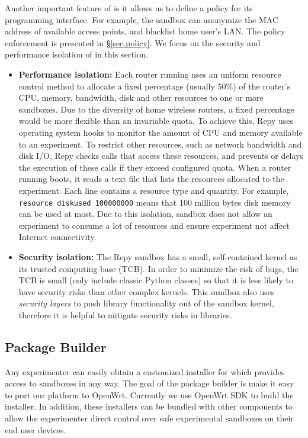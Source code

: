 Another important feature of \sandboxname is it allows us to define a policy for its programming interface. For example, the sandbox can anonymize the MAC address of available access points, and blacklist home user's LAN. The policy enforcement is presented in \S{\ref{sec.policy}}. We focus on the security and performance isolation of \sandboxname in this section.
\begin{itemize}
\item \textbf{Performance isolation: }Each router running \sysname uses an uniform resource control method to allocate a fixed percentage (usually 50\%) of the router's CPU, memory, bandwidth, disk and other resources to one or more sandboxes. Due to the diversity of home wireless routers, a fixed percentage would be more flexible than an invariable quota. To achieve this, Repy uses operating system hooks to monitor the amount of CPU and memory available to an experiment. To restrict other resources, such as network bandwidth and disk I/O, Repy checks calls that access these resources, and prevents or delays the execution of these calls if they exceed configured quota. When a router running \sysname boots, it reads a text file that lists the resources allocated to the experiment. Each line contains a resource type and quantity. For example, \texttt{resource diskused 100000000} means that 100 million bytes disk memory can be used at most. Due to this isolation, sandbox does not allow an experiment to consume a lot of resources and ensure experiment not affect Internet connectivity.

\item \textbf{Security isolation: }The Repy sandbox has a small, self-contained kernel as its trusted computing base (TCB). In order to minimize the risk of bugs, the TCB is small (only include classic Python classes) so that it is less likely to have security risks than other complex kernels. This sandbox also uses \textit{security layers} to push library functionality out of the sandbox kernel, therefore it is helpful to mitigate security risks in libraries. 

\end{itemize}
\subsection{Package Builder}
\label{sec.packagebuilder}
Any experimenter can easily obtain a customized installer for \sysname which provides access to sandboxes in any way. The goal of the package builder is make it easy to port our platform to OpenWrt. Currently we use OpenWrt SDK to build the installer. In addition, these installers can be bundled with other components to allow the experimenter direct control over safe experimental sandboxes on their end user devices.

